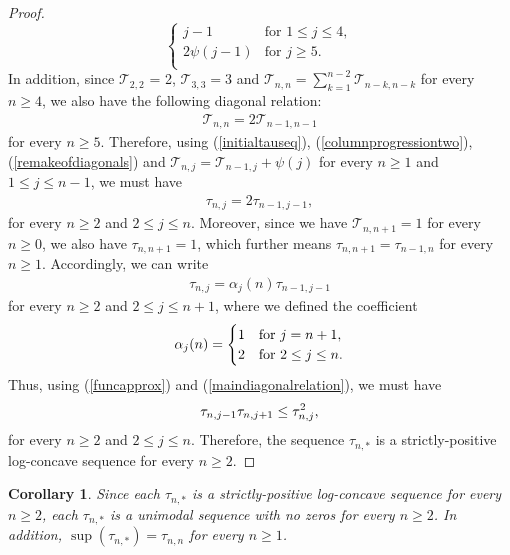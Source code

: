 \documentclass[a4paper,12pt]{article}
\newtheorem{coro}[thm]{Corollary}
\def\T{\mathcal{T}}
\begin{document}
\begin{proof}
\begin{equation}
\begin{cases}
j -1 & \text{for $1 \leq j \leq 4$},\\
2\psi(j-1) &  \text{for $j \geq 5$}. \\
\end{cases}
\end{equation}
In addition, since $\T_{2,2}$ = 2, $\T_{3,3} = 3$ and $\T_{n,n} = \sum_{k=1}^{n-2} \T_{n-k,n-k}$ for every $n \geq 4$, we also have the following diagonal relation:
\begin{align}
\T_{n,n} = 2\T_{n-1,n-1} \label{remakeofdiagonals}
\end{align}
for every $ n \geq 5$. Therefore, using (\ref{initialtauseq}), (\ref{columnprogressiontwo}), (\ref{remakeofdiagonals}) and $\T_{n,j} = \T_{n-1,j} + \psi(j)$ for every $n \geq 1$ and $1 \leq j \leq n-1$, we must have
\begin{align}
\tau_{n,j} = 2 \tau_{n-1,j-1}, \label{maindiagonalrelationfirsteq}
\end{align}
for every $n \geq 2$ and $2 \leq j \leq n$. Moreover, since we have $\T_{n,n+1} = 1$ for every $n \geq 0$, we also have $\tau_{n,n+1} = 1$, which further means $\tau_{n,n+1} = \tau_{n-1,n}$ for every $n \geq 1$. Accordingly, we can write
\begin{align}
\label{maindiagonalrelation}
\tau_{n,j} = \alpha_j(n) \tau_{n-1,j-1}
\end{align}
for every $n \geq 2$ and $2 \leq j \leq n+1$, where we defined the coefficient
\begin{equation}
\alpha_j(n) =
\begin{cases}
1 & \text{for $j = n+1$},\\
2 &  \text{for $2 \leq j \leq n$}. \notag
\end{cases}
\end{equation}
Thus, using (\ref{funcapprox}) and (\ref{maindiagonalrelation}), we must have 
\begin{align}
\tau_{n,j-1}\tau_{n,j+1} \leq \tau_{n,j}^2, \notag 
\end{align}
for every $n\geq 2$ and $2 \leq j \leq n$. Therefore, the sequence $\tau_{n,*}$ is a strictly-positive log-concave sequence for every $n\geq 2$.
\end{proof}
\begin{coro}
\label{unimodalitycorollaryres}
Since each $\tau_{n,*}$ is a strictly-positive log-concave sequence for every $n\geq 2$, each $\tau_{n,*}$ is a unimodal sequence with no zeros for every $n\geq 2$. In addition, $\sup(\tau_{n,*}) = \tau_{n,n}$ for every $n\geq 1$.
\end{coro}
\end{document}
